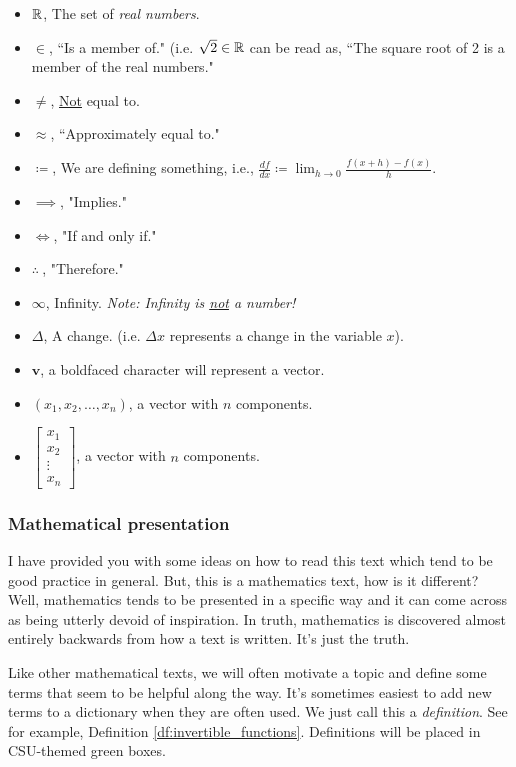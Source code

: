     \begin{itemize}
        \item $\mathbb{R}$, The set of \emph{real numbers}.
        \item $\in$, ``Is a member of." (i.e. $\sqrt{2}\in \mathbb{R}$ can be read as, ``The square root of 2 is a member of the real numbers."
        \item $\neq$, \underline{Not} equal to.
        \item $\approx$, ``Approximately equal to."
        \item $\coloneqq$, We are defining something, i.e., $\frac{df}{dx}\coloneqq \lim_{h\to 0}\frac{f(x+h)-f(x)}{h}$.
        \item $\implies$, "Implies."
        \item $\iff$, "If and only if."
        \item $\therefore~$, "Therefore."
        \item $\infty$, Infinity.  \emph{Note: Infinity is \underline{not} a number!}
        \item $\Delta$, A change. (i.e. $\Delta x$ represents a change in the variable $x$).
        \item $\mathbf{v}$, a boldfaced character will represent a vector.
        \item $(x_1,x_2,\dots,x_n)$, a vector with $n$ components.
        \item $\begin{bmatrix} x_1\\ x_2\\ \vdots \\ x_n\end{bmatrix}$, a vector with $n$ components.
    \end{itemize}
    
    \subsubsection{Mathematical presentation}
    
    I have provided you with some ideas on how to read this text which tend to be good practice in general.  But, this is a mathematics text, how is it different? Well, mathematics tends to be presented in a specific way and it can come across as being utterly devoid of inspiration.  In truth, mathematics is discovered almost entirely backwards from how a text is written.  It's just the truth.
    
    Like other mathematical texts, we will often motivate a topic and define some terms that seem to be helpful along the way.  It's sometimes easiest to add new terms to a dictionary when they are often used.  We just call this a \emph{definition}. See for example, Definition \ref{df:invertible_functions}. Definitions will be placed in CSU-themed green boxes.
    

